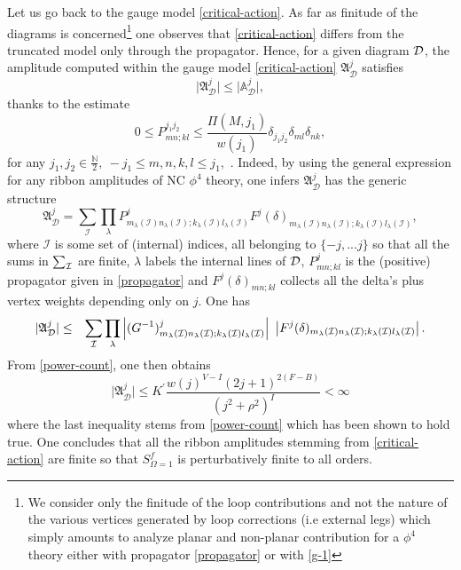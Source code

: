 \documentclass[11pt]{book}
\theoremstyle{break}
\begin{document}
Let us go back to the gauge model \eqref{critical-action}. As far as finitude of the diagrams is concerned{\footnote{We consider only the finitude of the loop contributions and not the nature of the various vertices generated by loop corrections (i.e external legs) which simply amounts to analyze planar and non-planar contribution for a $\phi^4$ theory either with propagator \eqref{propagator} or with \eqref{g-1}}} one observes that \eqref{critical-action} differs from the truncated model only through the propagator. Hence, for a given diagram ${\cal{D}}$, the amplitude computed within the gauge model \eqref{critical-action} $\mathfrak{A}^j_{\mathcal{D}}$ satisfies 
\begin{equation}
\vert \mathfrak{A}^j_{\mathcal{D}}\vert\le \vert \mathbb{A}^j_{\mathcal{D}}\vert,
\end{equation}
thanks to the estimate
\begin{equation}
0\le P^{j_1j_2}_{mn;kl}\le \frac{\Pi(M,j_1)}{w(j_1)}\delta_{j_1j_2}\delta_{ml}\delta_{nk}, \label{envelop-model}
\end{equation}
for any $j_1,j_2\in\frac{\mathbb{N}}{2},\ -j_1\le m,n,k,l\le j_1,$ . Indeed, by using the general expression for any ribbon amplitudes of NC $\phi^4$ theory, one infers $\mathfrak{A}^j_{\mathcal{D}}$ has the generic structure%
%
\begin{equation}
\mathfrak{A}^j_{\mathcal{D}} = \sum_{\mathcal{I}} \prod_\lambda P^j_{m_\lambda(\mathcal{I}) n_\lambda(\mathcal{I});k_\lambda(\mathcal{I}) l_\lambda(\mathcal{I})} F^j(\delta)_{m_\lambda(\mathcal{I}) n_\lambda(\mathcal{I});k_\lambda(\mathcal{I}) l_\lambda(\mathcal{I})},\label{amplit-arb}
\end{equation}
%
where $\mathcal{I}$ is some set of (internal) indices, all belonging to $\{-j,...j\}$ so that all the sums in $\sum_{{\cal{I}}}$ are finite, $\lambda$ labels the internal lines of ${\cal{D}}$, $P^j_{mn;kl}$ is the (positive) propagator given in \eqref{propagator} and $F^j(\delta)_{mn;kl}$ collects all the delta's plus vertex weights depending only on $j$. One has%
%
\begin{eqnarray}
\vert\mathfrak{A}^j_{\mathcal{D}}\vert &\le& \sum_{\mathcal{I}} \prod_\lambda \left|(G^{-1})^j_{m_\lambda(\mathcal{I}) n_\lambda(\mathcal{I}) ; k_\lambda(\mathcal{I}) l_\lambda(\mathcal{I})} \right| \ \left| F^j(\delta)_{m_\lambda({\cal{I}}) n_\lambda({\cal{I}});k_\lambda({\cal{I}}) l_\lambda({\cal{I}})} \right|.
\end{eqnarray}
%
From \eqref{power-count}, one then obtains
\begin{equation}
\vert\mathfrak{A}^j_{\mathcal{D}}\vert \le K^\prime\frac{w(j)^{V-I}(2j+1)^{2(F-B)}}{(j^2+\rho^2)^I}< \infty
\end{equation}
where the last inequality stems from \eqref{power-count} which has been shown to hold true. One concludes that all the ribbon amplitudes stemming from \eqref{critical-action} are finite so that $S^f_{\Omega=1}$ is perturbatively finite to all orders.\par%
\end{document}
